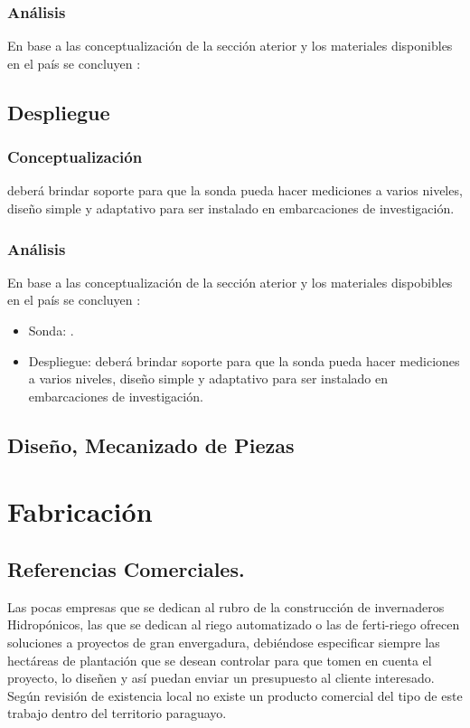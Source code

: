 \subsubsection{An\'alisis}
En base a las conceptualizaci\'on de la secci\'on aterior y los materiales disponibles en el pa\'is se concluyen  :


\subsection{Despliegue}
\subsubsection{Conceptualizaci\'on}

deber\'a brindar soporte para que la sonda pueda hacer mediciones a varios niveles, dise\~no simple y adaptativo para ser instalado en embarcaciones de investigaci\'on.

\subsubsection{An\'alisis}
En base a las conceptualizaci\'on de la secci\'on aterior y los materiales dispobibles en el pa\'is se concluyen  :
\begin{itemize}
    \item Sonda: .
    \item Despliegue: deber\'a brindar soporte para que la sonda pueda hacer mediciones a varios niveles, dise\~no simple y adaptativo para ser instalado en embarcaciones de investigaci\'on.
\end{itemize}

\subsection{Diseño, Mecanizado de Piezas}



\section{Fabricaci\'on}









         

\subsection{Referencias Comerciales.}
Las pocas empresas que se dedican al rubro de la construcción de invernaderos Hidropónicos, las que se dedican al riego automatizado o las de ferti-riego ofrecen soluciones a proyectos de gran envergadura, debiéndose especificar siempre las hectáreas de plantación que se desean controlar para que tomen en cuenta el proyecto, lo diseñen y así puedan enviar un presupuesto al cliente interesado.
Según revisión de existencia local no existe un producto comercial del tipo de este trabajo dentro del territorio paraguayo.\textbf{}